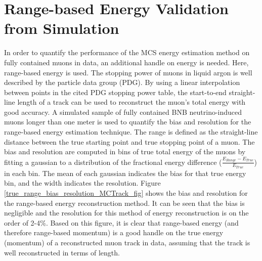 \documentclass[a4paper,11pt]{article}
\begin{document}
\section{Range-based Energy Validation from Simulation}\label{Range_Energy_Validation_section}
In order to quantify the performance of the MCS energy estimation method on fully contained muons in data, an additional handle on energy is needed. Here, range-based energy is used. The stopping power of muons in liquid argon is well described by the particle data group (PDG)\cite{PDG_spline_table}. By using a linear interpolation between points in the cited PDG stopping power table, the start-to-end straight-line length of a track can be used to reconstruct the muon's total energy with good accuracy. A simulated sample of fully contained BNB neutrino-induced muons longer than one meter is used to quantify the bias and resolution for the range-based energy estimation technique. The range is defined as the straight-line distance between the true starting point and true stopping point of a muon. The bias and resolution are computed in bins of true total energy of the muons by fitting a gaussian to a distribution of the fractional energy difference ($\frac{E_{Range}-E_{True}}{E_{True}}$) in each bin. The mean of each gaussian indicates the bias for that true energy bin, and the width indicates the resolution. Figure \ref{true_range_bias_resolution_MCTrack_fig} shows the bias and resolution for the range-based energy reconstruction method. It can be seen that the bias is negligible and the resolution for this method of energy reconstruction is on the order of 2-4\%. Based on this figure, it is clear that range-based energy (and therefore range-based momentum) is a good handle on the true energy (momentum) of a reconstructed muon track in data, assuming that the track is well reconstructed in terms of length.
\end{document}
